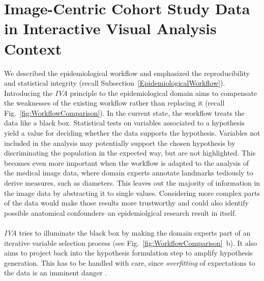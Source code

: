\documentclass[journal]{style/vgtc} 			          %
\begin{document}
\section{Image-Centric Cohort Study Data in Interactive Visual Analysis Context} \label{Image Centric Cohort Study Data in Interactive Visual Analysis Context}
We described the epidemiological workflow and emphasized the reproducibility and statistical integrity (recall Subsection~\ref{EpidemiologicalWorkflow}).
%
%
Introducing the \emph{IVA} principle to the epidemiological domain aims to compensate the weaknesses of the existing workflow rather than replacing it (recall Fig.~\ref{fig:WorkflowComparison}).
%
In the current state, the workflow treats the data like a black box.
%
Statistical tests on variables associated to a hypothesis yield a value for deciding whether the data supports the hypothesis.
%
Variables not included in the analysis may potentially support the chosen hypothesis by discriminating the population in the expected way, but are not highlighted.
%
This becomes even more important when the workflow is adapted to the analysis of the medical image data, where
domain experts annotate landmarks tediously to derive measures, such as diameters.
%
This leaves out the majority of information in the image data by abstracting it to single values.
%
%
Considering more complex parts of the data would make those results more trustworthy and could also identify possible anatomical confounders--an epidemiolgical research result in itself.
\\\\
\emph{IVA} tries to illuminate the black box by making the domain experts part of an iterative variable selection process (see Fig.~\ref{fig:WorkflowComparison}~b).
%
It also aims to project back into the hypothesis formulation step to amplify hypothesis generation.
%
This has to be handled with care, since \emph{overfitting} of expectations to the data is an imminent danger \cite{Turkay2013}.
\end{document}
